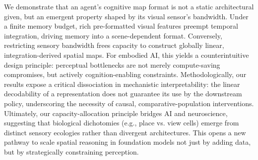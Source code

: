 \documentclass{article}
\begin{document}
We demonstrate that an agent’s cognitive map format is not a static architectural given, but an emergent property shaped by its visual sensor's bandwidth. Under a finite memory budget, rich pre-formatted visual features preempt temporal integration, driving memory into a scene-dependent format. Conversely, restricting sensory bandwidth frees capacity to construct globally linear, integration-derived spatial maps. For embodied AI, this yields a counterintuitive design principle: perceptual bottlenecks are not merely compute-saving compromises, but actively cognition-enabling constraints.
Methodologically, our results expose a critical dissociation in mechanistic interpretability: the linear decodability of a representation does not guarantee its use by the downstream policy, underscoring the necessity of causal, comparative-population interventions. Ultimately, our capacity-allocation principle bridges AI and neuroscience, suggesting that biological dichotomies (e.g., place vs. view cells) emerge from distinct sensory ecologies rather than divergent architectures. This opens a new pathway to scale spatial reasoning in foundation models not just by adding data, but by strategically constraining perception.

\end{document}
